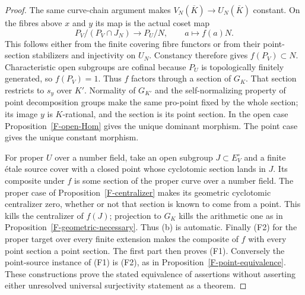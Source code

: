 \begin{proof}
The same curve-chain argument makes
$V_N(\overline K)\to U_N(\overline K)$ constant. On the
fibres above $x$ and $y$ its map is the actual coset map
\[
 P_V/(P_V\cap J_N)\longrightarrow P_U/N,
 \qquad a\longmapsto f(a)N.
\]
This follows either from the finite covering fibre functors or
from their point-section stabilizers and injectivity on $U_N$.
Constancy therefore gives $f(P_V)\subset N$. Characteristic
open subgroups are cofinal because $P_U$ is topologically
finitely generated, so $f(P_V)=1$. Thus $f$ factors through a
section of $G_K$. That section restricts to $s_y$ over $K'$.
Normality of $G_{K'}$ and the self-normalizing property of
point decomposition groups make the same pro-point fixed by the
whole section; its image $y$
is $K$-rational, and the section is its point section. In the
open case Proposition~\ref{F-open-Hom} gives the unique dominant
morphism. The point case gives the unique constant morphism.

For proper $U$ over a number field, take an open subgroup
$J\subset E_V^{\circ}$
and a finite \'etale source cover with a closed point whose
cyclotomic section lands in $J$. Its composite under $f$ is
some section of the proper curve over a number field. The
proper case of Proposition~\ref{F-centralizer} makes its
geometric cyclotomic centralizer zero, whether or not that
section is known to come from a point. This kills the
centralizer of $f(J)$; projection to $G_K$ kills the arithmetic
one as in Proposition~\ref{F-geometric-necessary}. Thus (b)
is automatic. Finally (F2) for the proper target over every
finite extension makes the composite of $f$ with every point
section a point section. The first part then proves (F1).
Conversely the point-source instance of (F1) is (F2), as in
Proposition~\ref{F-point-equivalence}. These constructions
prove the stated equivalence of assertions without asserting
either unresolved universal surjectivity statement as a theorem.
\end{proof}

